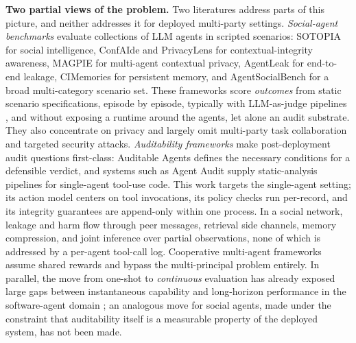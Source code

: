 \documentclass{article}
\begin{document}
\textbf{Two partial views of the problem.} Two literatures address parts of this picture, and neither addresses it for deployed multi-party settings. \emph{Social-agent benchmarks} evaluate collections of LLM agents in scripted scenarios: SOTOPIA \citep{zhou2024sotopia} for social intelligence, ConfAIde \citep{mireshghallah2024confaide} and PrivacyLens \citep{shao2024privacylens} for contextual-integrity awareness, MAGPIE \citep{juneja2025magpie} for multi-agent contextual privacy, AgentLeak \citep{elyagoubi2026agentleak} for end-to-end leakage, CIMemories \citep{cimemories2025} for persistent memory, and AgentSocialBench \citep{wang2026agentsocialbench} for a broad multi-category scenario set. These frameworks score \emph{outcomes} from static scenario specifications, episode by episode, typically with LLM-as-judge pipelines \citep{zheng2023judging}, and without exposing a runtime around the agents, let alone an audit substrate. They also concentrate on privacy and largely omit multi-party task collaboration and targeted security attacks. \emph{Auditability frameworks} make post-deployment audit questions first-class: Auditable Agents \citep{nian2026auditable} defines the necessary conditions for a defensible verdict, and systems such as Agent Audit \citep{zhang2026agentaudit} supply static-analysis pipelines for single-agent tool-use code. This work targets the single-agent setting; its action model centers on tool invocations, its policy checks run per-record, and its integrity guarantees are append-only within one process. In a social network, leakage and harm flow through peer messages, retrieval side channels, memory compression, and joint inference over partial observations, none of which is addressed by a per-agent tool-call log. Cooperative multi-agent frameworks \citep{hong2024metagpt,wu2023autogen,chen2024agentverse,li2023camel,qian2025scaling} assume shared rewards and bypass the multi-principal problem entirely. In parallel, the move from one-shot to \emph{continuous} evaluation has already exposed large gaps between instantaneous capability and long-horizon performance in the software-agent domain \citep{deng2026evoclaw}; an analogous move for social agents, made under the constraint that auditability itself is a measurable property of the deployed system, has not been made.
\end{document}
